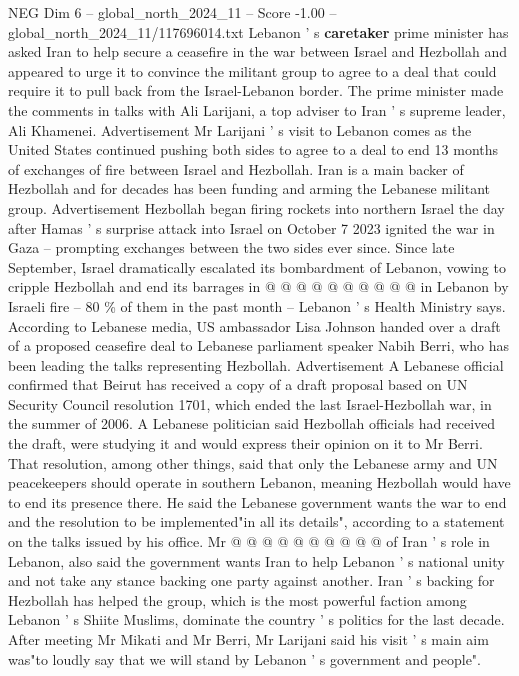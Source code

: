 \begin{textsample}{NEG Dim 6 – global\_north\_2024\_11 – Score -1.00 – global\_north\_2024\_11/117696014.txt}  \label{ex:f6_neg_164}
Lebanon ' s \textbf{caretaker} prime minister has asked Iran to help secure a ceasefire in the war between Israel and Hezbollah and appeared to urge it to convince the militant group to agree to a deal that could require it to pull back from the Israel-Lebanon border.
The prime minister made the comments in talks with Ali Larijani, a top adviser to Iran ' s supreme leader, Ali Khamenei.
Advertisement Mr Larijani ' s visit to Lebanon comes as the United States continued pushing both sides to agree to a deal to end 13 months of exchanges of fire between Israel and Hezbollah.
Iran is a main backer of Hezbollah and for decades has been funding and arming the Lebanese militant group.
Advertisement Hezbollah began firing rockets into northern Israel the day after Hamas ' s surprise attack into Israel on October 7 2023 ignited the war in Gaza -- prompting exchanges between the two sides ever since.
Since late September, Israel dramatically escalated its bombardment of Lebanon, vowing to cripple Hezbollah and end its barrages in @ @ @ @ @ @ @ @ @ @ in Lebanon by Israeli fire -- 80 \% of them in the past month -- Lebanon ' s Health Ministry says.
According to Lebanese media, US ambassador Lisa Johnson handed over a draft of a proposed ceasefire deal to Lebanese parliament speaker Nabih Berri, who has been leading the talks representing Hezbollah.
Advertisement A Lebanese official confirmed that Beirut has received a copy of a draft proposal based on UN Security Council resolution 1701, which ended the last Israel-Hezbollah war, in the summer of 2006.
A Lebanese politician said Hezbollah officials had received the draft, were studying it and would express their opinion on it to Mr Berri.
That resolution, among other things, said that only the Lebanese army and UN peacekeepers should operate in southern Lebanon, meaning Hezbollah would have to end its presence there.
He said the Lebanese government wants the war to end and the resolution to be implemented"in all its details", according to a statement on the talks issued by his office.
Mr @ @ @ @ @ @ @ @ @ @ of Iran ' s role in Lebanon, also said the government wants Iran to help Lebanon ' s national unity and not take any stance backing one party against another.
Iran ' s backing for Hezbollah has helped the group, which is the most powerful faction among Lebanon ' s Shiite Muslims, dominate the country ' s politics for the last decade.
After meeting Mr Mikati and Mr Berri, Mr Larijani said his visit ' s main aim was"to loudly say that we will stand by Lebanon ' s government and people".

\end{textsample}
